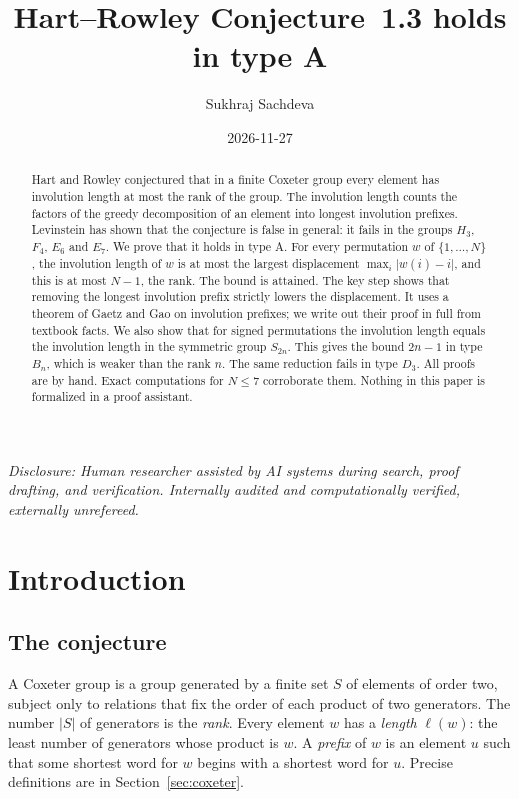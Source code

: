 \documentclass[11pt]{amsart}
\title[Hart--Rowley Conjecture 1.3 in type A]{Hart--Rowley Conjecture~1.3 holds in type A}
\author{Sukhraj Sachdeva}
\date{2026-11-27\doiline}
\theoremstyle{definition}
\theoremstyle{remark}
\numberwithin{equation}{section}
\newcommand{\abs}[1]{\lvert #1\rvert}
\begin{document}
\begin{abstract}
Hart and Rowley conjectured that in a finite Coxeter group every element has involution length at most the rank of the group. The involution length counts the factors of the greedy decomposition of an element into longest involution prefixes. Levinstein has shown that the conjecture is false in general: it fails in the groups \(H_3\), \(F_4\), \(E_6\) and \(E_7\). We prove that it holds in type A. For every permutation \(w\) of \(\{1,\dots,N\}\), the involution length of \(w\) is at most the largest displacement \(\max_i\abs{w(i)-i}\), and this is at most \(N-1\), the rank. The bound is attained. The key step shows that removing the longest involution prefix strictly lowers the displacement. It uses a theorem of Gaetz and Gao on involution prefixes; we write out their proof in full from textbook facts. We also show that for signed permutations the involution length equals the involution length in the symmetric group \(S_{2n}\). This gives the bound \(2n-1\) in type \(B_n\), which is weaker than the rank \(n\). The same reduction fails in type \(D_3\). All proofs are by hand. Exact computations for \(N\le7\) corroborate them. Nothing in this paper is formalized in a proof assistant.
\end{abstract}

\maketitle

\noindent\emph{Disclosure: Human researcher assisted by AI systems during search, proof drafting, and verification. Internally audited and computationally verified, externally unrefereed.}\par\medskip

\section{Introduction}\label{sec:intro}

\subsection{The conjecture}
A Coxeter group is a group generated by a finite set \(S\) of elements of order two, subject only to relations that fix the order of each product of two generators. The number \(\abs{S}\) of generators is the \emph{rank}. Every element \(w\) has a \emph{length} \(\ell(w)\): the least number of generators whose product is \(w\). A \emph{prefix} of \(w\) is an element \(u\) such that some shortest word for \(w\) begins with a shortest word for \(u\). Precise definitions are in Section~\ref{sec:coxeter}.
\end{document}
